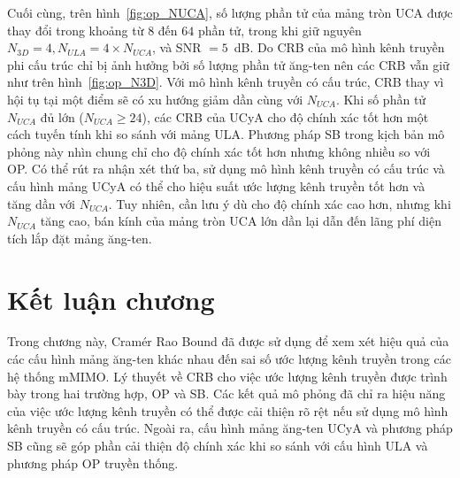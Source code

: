 Cuối cùng, trên hình~\ref{fig:op_NUCA}, số lượng phần tử của mảng tròn UCA được thay đổi trong khoảng từ $8$ đến $64$ phần tử, trong khi giữ nguyên $N_{3D} = 4, N_{ULA} = 4 \times N_{UCA}$, và SNR $=5$~dB. Do CRB của mô hình kênh truyền phi cấu trúc chỉ bị ảnh hưởng bởi số lượng phần tử ăng-ten nên các CRB vẫn giữ như trên hình~\ref{fig:op_N3D}. Với mô hình kênh truyền có cấu trúc, CRB thay vì hội tụ tại một điểm sẽ có xu hướng giảm dần cùng với $N_{UCA}$. Khi số phần tử $N_{UCA}$ đủ lớn ($N_{UCA} \ge 24$), các CRB của UCyA cho độ chính xác tốt hơn một cách tuyến tính khi so sánh với mảng ULA. Phương pháp SB trong kịch bản mô phỏng này nhìn chung chỉ cho độ chính xác tốt hơn nhưng không nhiều so với OP. Có thể rút ra nhận xét thứ ba, sử dụng mô hình kênh truyền có cấu trúc và cấu hình mảng UCyA có thể cho hiệu suất ước lượng kênh truyền tốt hơn và tăng dần với $N_{UCA}$. Tuy nhiên, cần lưu ý dù cho độ chính xác cao hơn, nhưng khi $N_{UCA}$ tăng cao, bán kính của mảng tròn UCA lớn dần lại dẫn đến lãng phí diện tích lắp đặt mảng ăng-ten.

\section{Kết luận chương}
Trong chương này, Cramér Rao Bound đã được sử dụng để xem xét hiệu quả của các cấu hình mảng ăng-ten khác nhau đến sai số ước lượng kênh truyền trong các hệ thống mMIMO. Lý thuyết về CRB cho việc ước lượng kênh truyền được trình bày trong hai trường hợp, OP và SB. Các kết quả mô phỏng đã chỉ ra hiệu năng của việc ước lượng kênh truyền có thể được cải thiện rõ rệt nếu sử dụng mô hình kênh truyền có cấu trúc. Ngoài ra, cấu hình mảng ăng-ten UCyA và phương pháp SB cũng sẽ góp phần cải thiện độ chính xác khi so sánh với cấu hình ULA và phương pháp OP truyền thống.